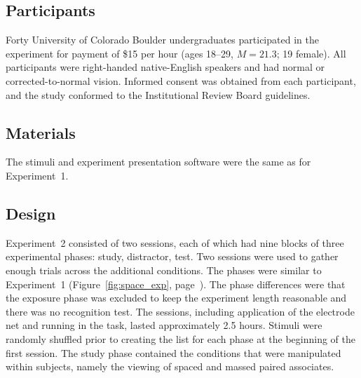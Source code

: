 \subsection{Participants}


Forty University of Colorado Boulder undergraduates participated in the experiment for payment of \$15 per hour (ages 18--29, $M=21.3$; 19 female).  All participants were right-handed native-English speakers and had normal or corrected-to-normal vision.  Informed consent was obtained from each participant, and the study conformed to the Institutional Review Board guidelines.

\subsection{Materials}

The stimuli and experiment presentation software were the same as for Experiment~1.

\subsection{Design}


Experiment~2 consisted of two sessions, each of which had nine blocks of three experimental phases: study, distractor, test.
\cbstart
Two sessions were used to gather enough trials across the additional conditions.
\cbend
The phases were similar to Experiment~1 (Figure~\ref{fig:space_exp}, page~\pageref{fig:space_exp}).  The phase differences were that the exposure phase was excluded to keep the experiment length reasonable and there was no recognition test.
The sessions, including application of the electrode net and running in the task, lasted approximately 2.5 hours.  Stimuli were randomly shuffled prior to creating the list for each phase at the beginning of the first session.  The study phase contained the conditions that were manipulated within subjects, namely the viewing of spaced and massed paired associates.

